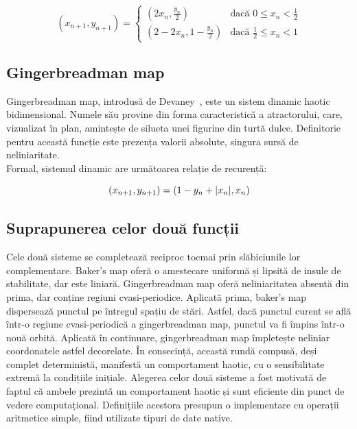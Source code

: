 \begin{equation}
    (x_{n+1}, y_{n+1}) =
    \begin{cases}
        (2x_n, \frac{y_n}{2}) & \text{dacă } 0 \leq x_n < \frac{1}{2} \\
        (2 - 2x_n, 1 - \frac{y_n}{2}) & \text{dacă } \frac{1}{2} \leq x_n < 1
    \end{cases}
\end{equation}

\subsection{Gingerbreadman map}

Gingerbreadman map, introdusă de Devaney~\cite{devaney1989}, este un sistem dinamic haotic bidimensional.
Numele său provine din forma caracteristică a atractorului, care, vizualizat în plan, amintește de silueta unei figurine din turtă dulce.
Definitorie pentru această funcție este prezența valorii absolute, singura sursă de neliniaritate. \\
Formal, sistemul dinamic are următoarea relație de recurență:

\begin{equation}
    (x_{n+1}, y_{n+1}) = (1-y_n + \lvert x_n\rvert, x_n)
\end{equation}

\subsection{Suprapunerea celor două funcții}

Cele două sisteme se completează reciproc tocmai prin slăbiciunile lor complementare.
Baker's map oferă o amestecare uniformă și lipsită de insule de stabilitate, dar este liniară.
Gingerbreadman map oferă neliniaritatea absentă din prima, dar conține regiuni cvasi-periodice.
Aplicată prima, baker's map dispersează punctul pe întregul spațiu de stări.
Astfel, dacă punctul curent se află într-o regiune cvasi-periodică a gingerbreadman map, punctul va fi împins într-o nouă orbită.
Aplicată în continuare, gingerbreadman map împletește neliniar coordonatele astfel decorelate.
În consecință, această rundă compusă, deși complet deterministă, manifestă un comportament haotic, cu o sensibilitate extremă la condițiile inițiale.
Alegerea celor două sisteme a fost motivată de faptul că ambele prezintă un comportament haotic și sunt eficiente din punct de vedere computațional.
Definițiile acestora presupun o implementare cu operații aritmetice simple, fiind utilizate tipuri de date native.

